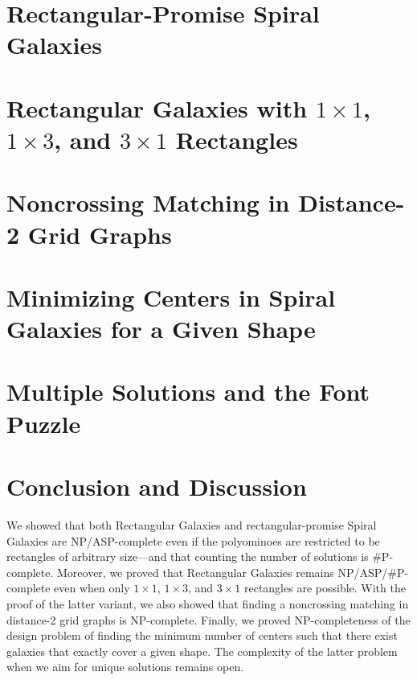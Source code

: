 \documentclass{elsarticle}
\begin{document}
\section{Rectangular-Promise Spiral Galaxies}\label{sec:sgr}


\section{Rectangular Galaxies with $1\times1$, $1\times3$, and $3\times1$ Rectangles}\label{sec:sgr13}


\section{Noncrossing Matching in Distance-2 Grid Graphs}\label{sec:match}


\section{Minimizing Centers in Spiral Galaxies for a Given Shape}\label{sec:nrc}


\section{Multiple Solutions and the Font Puzzle}\label{sec:puzz}




\section{Conclusion and Discussion}\label{sec:conclusion}
We showed that both Rectangular Galaxies and rectangular-promise Spiral Galaxies are NP/ASP-complete even if the polyominoes are restricted to be rectangles of arbitrary size---and that counting the number of solutions is \#P-complete. Moreover, we proved that Rectangular Galaxies remains NP/ASP/\#P-complete even when only $1\times1$, $1\times3$, and $3\times1$ rectangles are possible. With the proof of the latter variant, we also showed that finding a noncrossing matching in distance-2 grid graphs is NP-complete. %
Finally, we proved NP-completeness of the design problem of finding the minimum number of centers such that there exist galaxies that exactly cover a given shape. The complexity of the latter problem when we aim for unique solutions remains open.
\end{document}
